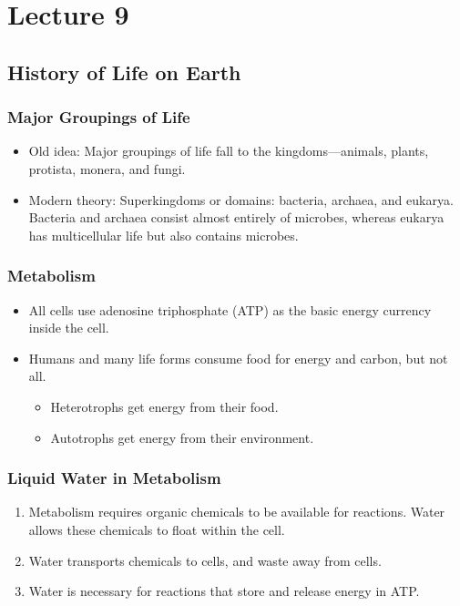 \documentclass[class=article, crop=false]{standalone}
\begin{document}
  \section{Lecture 9}
  \subsection{History of Life on Earth}
  \subsubsection{Major Groupings of Life}
  \begin{itemize}
    \item Old idea: Major groupings of life fall to the kingdoms---animals, plants, protista, monera, and fungi.
    \item Modern theory: Superkingdoms or domains: bacteria, archaea, and eukarya. Bacteria and archaea consist almost entirely of microbes, whereas eukarya has multicellular life but also contains microbes.
  \end{itemize}
  \subsubsection{Metabolism}
  \begin{itemize}
    \item All cells use adenosine triphosphate (ATP) as the basic energy currency inside the cell.
    \item Humans and many life forms consume food for energy and carbon, but not all.
    \begin{itemize}
      \item Heterotrophs get energy from their food.
      \item Autotrophs get energy from their environment.
    \end{itemize}
  \end{itemize}
  \subsubsection{Liquid Water in Metabolism}
  \begin{enumerate}
    \item Metabolism requires organic chemicals to be available for reactions. Water allows these chemicals to float within the cell.
    \item Water transports chemicals to cells, and waste away from cells.
    \item Water is necessary for reactions that store and release energy in ATP.
  \end{enumerate}
\end{document}
